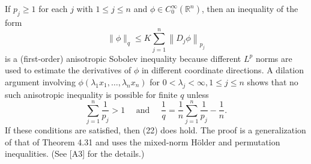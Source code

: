 \begin{para}
  If $p_j \geq 1$ for each $j$ with $1 \leq j \leq n$ and $\phi \in C_0^{\infty}\left(\mathbb{R}^n\right)$, then an inequality of the form
  \begin{equation}
    \|\phi\|_q \leq K \sum_{j=1}^n\left\|D_j \phi\right\|_{p_j}
  \end{equation}
  is a (first-order) anisotropic Sobolev inequality because different $L^p$ norms are used to estimate the derivatives of $\phi$ in different coordinate directions. A dilation argument involving $\phi\left(\lambda_1 x_1, \ldots, \lambda_n x_n\right)$ for $0<\lambda_j<\infty, 1 \leq j \leq n$ shows that no such anisotropic inequality is possible for finite $q$ unless
  \[
  \sum_{j=1}^n \frac{1}{p_j}>1 \quad \text { and } \quad \frac{1}{q}=\frac{1}{n} \sum_{j=1}^n \frac{1}{p_j}-\frac{1}{n} .
  \]
  If these conditions are satisfied, then (22) does hold. The proof is a generalization of that of Theorem 4.31 and uses the mixed-norm Hölder and permutation inequalities. (See [A3] for the details.)
\end{para}


